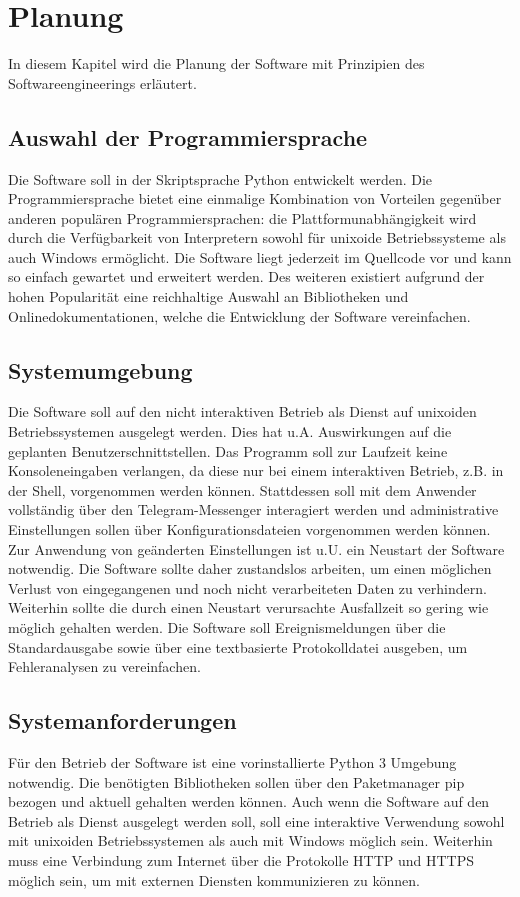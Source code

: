 \chapter{Planung}

In diesem Kapitel wird die Planung der Software mit Prinzipien des Softwareengineerings erläutert. 

\section{Auswahl der Programmiersprache}

Die Software soll in der Skriptsprache Python entwickelt werden. Die Programmiersprache bietet eine einmalige Kombination von Vorteilen gegenüber anderen populären Programmiersprachen: die Plattformunabhängigkeit wird durch die Verfügbarkeit von Interpretern sowohl für unixoide Betriebssysteme als auch Windows ermöglicht. Die Software liegt jederzeit im Quellcode vor und kann so einfach gewartet und erweitert werden. Des weiteren existiert aufgrund der hohen Popularität \cite{tiobe-python} eine reichhaltige Auswahl an Bibliotheken und Onlinedokumentationen, welche die Entwicklung der Software vereinfachen. 

\section{Systemumgebung}

Die Software soll auf den nicht interaktiven Betrieb als Dienst auf unixoiden Betriebssystemen ausgelegt werden. Dies hat u.A. Auswirkungen auf die geplanten Benutzerschnittstellen. Das Programm soll zur Laufzeit keine Konsoleneingaben verlangen, da diese nur bei einem interaktiven Betrieb, z.B. in der Shell, vorgenommen werden können. Stattdessen soll mit dem Anwender vollständig über den Telegram-Messenger interagiert werden und administrative Einstellungen sollen über Konfigurationsdateien vorgenommen werden können. Zur Anwendung von geänderten Einstellungen ist u.U. ein Neustart der Software notwendig. Die Software sollte daher zustandslos arbeiten, um einen möglichen Verlust von eingegangenen und noch nicht verarbeiteten Daten zu verhindern. Weiterhin sollte die durch einen Neustart verursachte Ausfallzeit so gering wie möglich gehalten werden. Die Software soll Ereignismeldungen über die Standardausgabe sowie über eine textbasierte Protokolldatei ausgeben, um Fehleranalysen zu vereinfachen.

\section{Systemanforderungen}
Für den Betrieb der Software ist eine vorinstallierte Python 3 Umgebung notwendig. Die benötigten Bibliotheken sollen über den Paketmanager pip bezogen und aktuell gehalten werden können. Auch wenn die Software auf den Betrieb als Dienst ausgelegt werden soll, soll eine interaktive Verwendung sowohl mit unixoiden Betriebssystemen als auch mit Windows möglich sein. Weiterhin muss eine Verbindung zum Internet über die Protokolle HTTP und HTTPS möglich sein, um mit externen Diensten kommunizieren zu können.


